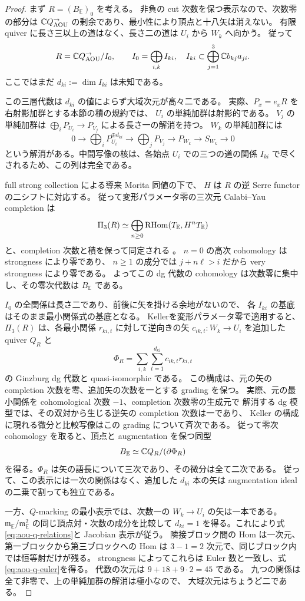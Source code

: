 \begin{proof}
まず $R=(B_{\mathbb E})_0$ を考える。
非負の cut 次数を保つ表示なので、次数零の部分は
$\mathbb C Q_{\rm AOU}^{\to}$ の剰余であり、最小性により頂点と十八矢は消えない。
有限 quiver に長さ三以上の道はなく、長さ二の道は $U_i$ から $W_k$ へ向かう。
従って
\[
 R=\mathbb C Q_{\rm AOU}^{\to}/I_0,\qquad
 I_0=\bigoplus_{i,k}I_{ki},\quad
 I_{ki}\subset\bigoplus_{j=1}^3\mathbb C b_{kj}a_{ji}.
\]
ここではまだ $d_{ki}:=\dim I_{ki}$ は未知である。

この三層代数は $d_{ki}$ の値によらず大域次元が高々二である。
実際、$P_x=e_xR$ を右射影加群とする本節の積の規約では、
$U_i$ の単純加群は射影的である。
$V_j$ の単純加群は $\bigoplus_iP_{U_i}\to P_{V_j}$ による長さ一の解消を持つ。
$W_k$ の単純加群には
\[
 0\longrightarrow\bigoplus_iP_{U_i}^{\oplus d_{ki}}
 \longrightarrow\bigoplus_jP_{V_j}
 \longrightarrow P_{W_k}\longrightarrow S_{W_k}\longrightarrow0
\]
という解消がある。中間写像の核は、各始点 $U_i$ での三つの道の関係
$I_{ki}$ で尽くされるため、この列は完全である。

full strong collection による導来 Morita 同値の下で、
$H$ は $R$ の逆 Serre functor の二シフトに対応する。
従って変形パラメータ零の三次元 Calabi--Yau completion は
\[
 \Pi_3(R)\simeq
 \bigoplus_{n\ge0}\operatorname{RHom}(T_{\mathbb E},H^nT_{\mathbb E})
\]
と、completion 次数と積を保って同定される
\cite[(18)--(22)]{OUHelix}。
$n=0$ の高次 cohomology は strongness により零であり、
$n\ge1$ の成分では $j+n\ell>i$ だから very strongness により零である。
よってこの dg 代数の cohomology は次数零に集中し、その零次代数は $B_{\mathbb E}$ である。

$I_0$ の全関係は長さ二であり、前後に矢を掛ける余地がないので、
各 $I_{ki}$ の基底はそのまま最小関係式の基底となる。
Keller\cite[\S6.9, Theorem 6.10]{KellerCY}を変形パラメータ零で適用すると、
$\Pi_3(R)$ は、各最小関係 $r_{ki,t}$ に対して逆向きの矢
$c_{ik,t}:W_k\to U_i$ を追加した quiver $Q_R$ と
\[
 \Phi_R=\sum_{i,k}\sum_{t=1}^{d_{ki}}c_{ik,t}r_{ki,t}
\]
の Ginzburg dg 代数と quasi-isomorphic である。
この構成は、元の矢の completion 次数を零、追加矢の次数を一とする grading を保つ。
実際、元の最小関係を cohomological 次数 $-1$、completion 次数零の生成元で
解消する dg 模型では、その双対から生じる逆矢の completion 次数は一であり、
Keller の構成に現れる微分と比較写像はこの grading について斉次である。
従って零次 cohomology を取ると、頂点と augmentation を保つ同型
\[
 B_{\mathbb E}\simeq\mathbb C Q_R/(\partial\Phi_R)
\]
を得る。$\Phi_R$ は矢の語長について三次であり、その微分は全て二次である。
従って、この表示には一次の関係はなく、追加した $d_{ki}$ 本の矢は
augmentation ideal の二乗で割っても独立である。

一方、$Q$-marking の最小表示では、次数一の
$W_k\to U_i$ の矢は一本である。
$\mathfrak m_{\mathbb E}/\mathfrak m_{\mathbb E}^2$ の同じ頂点対・次数の成分を比較して
$d_{ki}=1$ を得る。これにより式\eqref{eq:aou-q-relations}と Jacobian 表示が従う。
隣接ブロック間の Hom は一次元、第一ブロックから第三ブロックへの Hom は
$3-1=2$ 次元で、同じブロック内では恒等射だけが残る。
strongness によってこれらは Euler 数と一致し、式\eqref{eq:aou-q-euler}を得る。
代数の次元は $9+18+9\cdot2=45$ である。
九つの関係は全て非零で、上の単純加群の解消は極小なので、
大域次元はちょうど二である。
\end{proof}

